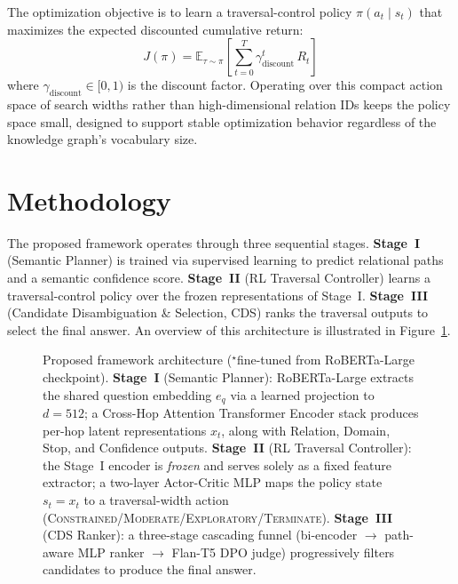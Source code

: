 \documentclass[10pt,conference]{IEEEtran}
\begin{document}
The optimization objective is to learn a traversal-control policy $\pi(a_t \mid s_t)$ that maximizes the expected discounted cumulative return:
\begin{equation}
J(\pi) = \mathbb{E}_{\tau \sim \pi}\!\left[\sum_{t=0}^{T} \gamma_{\text{discount}}^{t}\, R_t\right]
\end{equation}
where $\gamma_{\text{discount}} \in [0, 1)$ is the discount factor. Operating over this compact action space of search widths rather than high-dimensional relation IDs keeps the policy space small, designed to support stable optimization behavior regardless of the knowledge graph's vocabulary size.


\section{Methodology}

The proposed framework operates through three sequential stages. \textbf{Stage~I} (Semantic Planner) is trained via supervised learning to predict relational paths and a semantic confidence score. \textbf{Stage~II} (RL Traversal Controller) learns a traversal-control policy over the frozen representations of Stage~I. \textbf{Stage~III} (Candidate Disambiguation \& Selection, CDS) ranks the traversal outputs to select the final answer. An overview of this architecture is illustrated in Figure~\ref{fig:arch}.

\begin{figure}[t]
\centering

\caption{Proposed framework architecture ($^\star$fine-tuned from RoBERTa-Large checkpoint). \textbf{Stage~I} (Semantic Planner): RoBERTa-Large extracts the shared question embedding $e_q$ via a learned projection to $d{=}512$; a Cross-Hop Attention Transformer Encoder stack produces per-hop latent representations $x_t$, along with Relation, Domain, Stop, and Confidence outputs. \textbf{Stage~II} (RL Traversal Controller): the Stage~I encoder is \emph{frozen} and serves solely as a fixed feature extractor; a two-layer Actor-Critic MLP maps the policy state $s_t = x_t$ to a traversal-width action (\textsc{Constrained}/\textsc{Moderate}/\textsc{Exploratory}/\textsc{Terminate}). \textbf{Stage~III} (CDS Ranker): a three-stage cascading funnel (bi-encoder $\to$ path-aware MLP ranker $\to$ Flan-T5 DPO judge) progressively filters candidates to produce the final answer.}
\label{fig:arch}
\end{figure}
\end{document}
